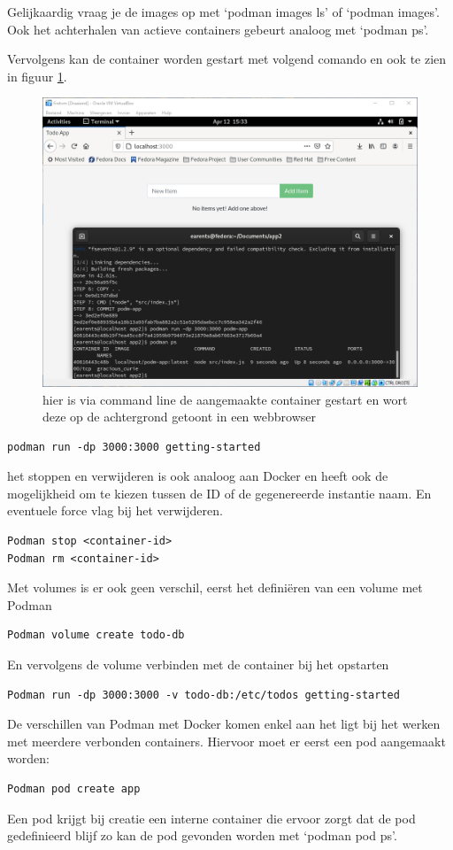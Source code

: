 Gelijkaardig vraag je de images op met `podman images ls' of `podman images'. Ook het achterhalen van actieve containers gebeurt analoog met `podman ps'.

Vervolgens kan de container worden gestart met volgend comando en ook te zien in figuur \ref{fig:podmanrun}. 
\begin{figure}[h]
    \includegraphics[width=\linewidth]{img/podmanrun.png}
    \caption[Podman die een web ap uitvoert]{hier is via command line de aangemaakte container gestart en wort deze op de achtergrond getoont in een webbrowser}
    \label{fig:podmanrun}
    \centering
\end{figure}
\begin{verbatim}
podman run -dp 3000:3000 getting-started
\end{verbatim}
het stoppen en verwijderen is ook analoog aan Docker en heeft ook de mogelijkheid om te kiezen tussen de ID of de gegenereerde instantie naam. En eventuele force vlag bij het verwijderen.
\begin{verbatim}
Podman stop <container-id>
Podman rm <container-id>
\end{verbatim}
Met volumes is er ook geen verschil, eerst het definiëren van een volume met Podman
\begin{verbatim}
Podman volume create todo-db
\end{verbatim}
En vervolgens de volume verbinden met de container bij het opstarten
\begin{verbatim}
Podman run -dp 3000:3000 -v todo-db:/etc/todos getting-started
\end{verbatim}
De verschillen van Podman met Docker komen enkel aan het ligt bij het werken met meerdere verbonden containers. Hiervoor moet er eerst een pod aangemaakt worden:
\begin{verbatim}
Podman pod create app
\end{verbatim}
Een pod krijgt bij creatie een interne container die ervoor zorgt dat de pod gedefinieerd blijf zo kan de pod gevonden worden met ‘podman pod ps’.

